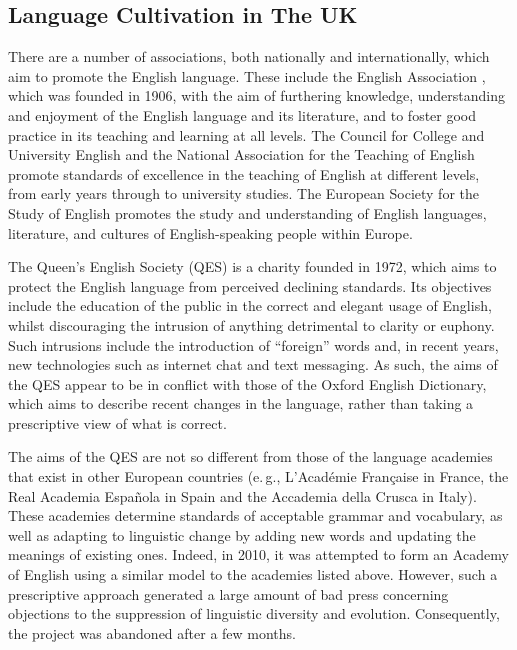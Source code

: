 \documentclass[]{../../metanetpaper}
\begin{document}
\begin{multicols}{2}

\subsection{Language Cultivation in The UK}

There are a number of associations, both nationally and internationally, which aim to promote the English language. These include the English Association \cite{EngAssoc}, which was founded in 1906, with the aim of furthering knowledge, understanding and enjoyment of the English language and its literature, and to foster good practice in its teaching and learning at all levels. The Council for College and University English \cite{ccue} and the National Association for the Teaching of English \cite{nate} promote standards of excellence in the teaching of English at different levels, from early years through to university studies. The European Society for the Study of English \cite{essen} promotes the study and understanding of English languages, literature, and cultures of English-speaking people within Europe. 
    
The Queen's English Society \cite{qes} (QES) is a charity founded in 1972, which aims to protect the English language from perceived declining standards. Its objectives include the education of the public in the correct and elegant usage of English, whilst discouraging the intrusion of anything detrimental to clarity or euphony. Such intrusions include the introduction of ``foreign'' words and, in recent years, new technologies such as internet chat and text messaging. As such, the aims of the QES appear to be in conflict with those of the Oxford English Dictionary, which aims to describe recent changes in the language, rather than taking a prescriptive view of what is correct.
    
The aims of the QES are not so different from those of the language academies that exist in other European countries (e.\,g., L'Acad\'{e}mie Fran\c{c}aise in France, the Real Academia Espa\~{n}ola in Spain and the Accademia della Crusca in Italy). These academies determine standards of acceptable grammar and vocabulary, as well as adapting to linguistic change by adding new words and updating the meanings of existing ones. Indeed, in 2010, it was attempted to form an Academy of English using a similar model to the academies listed above.  However, such a prescriptive approach generated a large amount of bad press concerning objections to the suppression of linguistic diversity and evolution. Consequently, the project was abandoned after a few months.   


\end{multicols}
\end{document}
